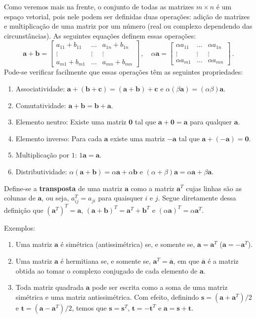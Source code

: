 \documentclass[12pt,a4paper]{report}
\newcommand{\mb}{\mathbf}
\begin{document}
Como veremos mais na frente, o conjunto de todas as matrizes $m\times n$ é um espaço vetorial, pois nele podem ser definidas duas operações: adição de matrizes e multiplicação de uma matriz por um número (real ou complexo dependendo das circunstâncias). As seguintes equações definem essas operações:
$$\mb{a}+\mb{b}=\begin{bmatrix}
  a_{11}+b_{11}&\ldots&a_{1n}+b_{1n}\\
  \vdots&\vdots&\vdots\\
  a_{m1}+b_{m1}&\ldots&a_{mn}+b_{mn}
\end{bmatrix}\,,\quad
\alpha\mb{a}=\begin{bmatrix}
  \alpha a_{11}&\ldots&\alpha a_{1n}\\
  \vdots&\vdots&\vdots\\
  \alpha a_{m1}&\ldots&\alpha a_{mn}
\end{bmatrix}\,.$$
Pode-se verificar facilmente que essas operações têm as seguintes propriedades:
\begin{enumerate}
  \item Associatividade: $\mb{a}+(\mb{b}+\mb{c})=(\mb{a}+\mb b)+\mb c$ e $\alpha(\beta \mb a)=(\alpha\beta)\mb a$.
  \item Comutatividade: $\mb a+\mb b=\mb b+\mb a$.
  \item Elemento neutro: Existe uma matriz $\mb 0$ tal que $\mb a+\mb 0=\mb a$ para qualquer $\mb a$.
  \item Elemento inverso: Para cada $\mb a$ existe uma matriz $-\mb a$ tal que $\mb a+(-\mb a)=\mb 0$.
  \item Multiplicação por $1$: $1\mb a=\mb a$.
  \item Distributividade: $\alpha(\mb a+\mb b)=\alpha\mb a+\alpha\mb b$ e $(\alpha+\beta)\mb a=\alpha\mb a+\beta\mb a$.
\end{enumerate}

Define-se a \textbf{transposta} de uma matriz $\mb a$ como a matriz $\mb a^T$ cujas linhas são as colunas de $\mb a$, ou seja, $a_{ij}^T=a_{ji}$ para quaisquer $i$ e $j$. Segue diretamente dessa definição que $(\mb a^T)^T=\mb a$, $(\mb a+\mb b)^T=\mb a^T+\mb b^T$ e $(\alpha\mb a)^T=\alpha\mb a^T$.

Exemplos:

\begin{enumerate}
  \item Uma matriz $\mb a$ é simétrica (antissimétrica) se, e somente se, $\mb a=\mb a^T$ ($\mb a=-\mb a^T$).
  \item Uma matriz $\mb a$ é hermitiana se, e somente se, $\mb a^T=\overline{\mb a}$, em que $\overline{\mb a}$ é a matriz obtida ao tomar o complexo conjugado de cada elemento de $\mb a$.
  \item Toda matriz quadrada $\mb a$ pode ser escrita como a soma de uma matriz simétrica e uma matriz antissimétrica. Com efeito, definindo $\mb s=(\mb a+\mb a^T)/2$ e $\mb t=(\mb a-\mb a^T)/2$, temos que $\mb s=\mb s^T$, $\mb t=-\mb t^T$ e $\mb a=\mb s+\mb t$.
\end{enumerate}
\end{document}
